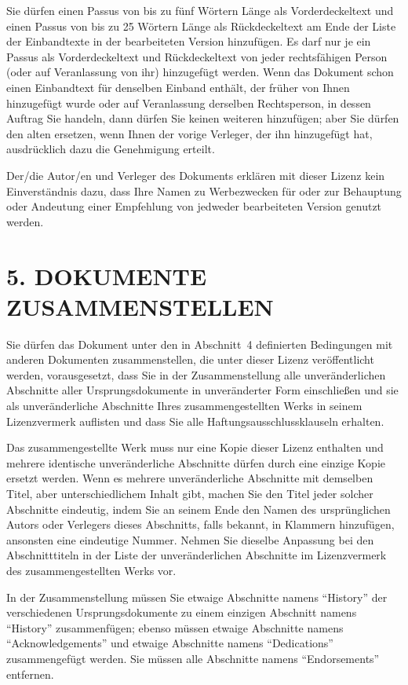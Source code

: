 Sie dürfen einen Passus von bis zu fünf Wörtern Länge als Vorderdeckeltext und einen
Passus von bis zu 25 Wörtern Länge als Rückdeckeltext am Ende der Liste der Einbandtexte
in der bearbeiteten Version hinzufügen. Es darf nur je ein Passus als Vorderdeckeltext
und Rückdeckeltext von jeder rechtsfähigen Person (oder auf Veranlassung von ihr) hinzugefügt werden.
Wenn das Dokument schon einen Einbandtext für denselben Einband enthält, der früher von Ihnen
hinzugefügt wurde oder auf Veranlassung derselben Rechtsperson, in dessen Auftrag Sie handeln,
dann dürfen Sie keinen weiteren hinzufügen; aber Sie dürfen den alten ersetzen, wenn Ihnen
der vorige Verleger, der ihn hinzugefügt hat, ausdrücklich dazu die Genehmigung erteilt.

Der/die Autor/en und Verleger des Dokuments erklären mit dieser Lizenz kein Einverständnis
dazu, dass Ihre Namen zu Werbezwecken für oder zur Behauptung oder Andeutung einer Empfehlung von 
jedweder bearbeiteten Version genutzt werden.

\section*{5. DOKUMENTE ZUSAMMENSTELLEN}

Sie dürfen das Dokument unter den in Abschnitt~4 definierten Bedingungen 
mit anderen Dokumenten zusammenstellen, die unter dieser Lizenz veröffentlicht
werden, vorausgesetzt, dass Sie in der Zusammenstellung alle unveränderlichen 
Abschnitte aller Ursprungsdokumente in unveränderter Form einschließen und
sie als unveränderliche Abschnitte Ihres zusammengestellten Werks in seinem
Lizenzvermerk auflisten und dass Sie alle Haftungsausschlussklauseln erhalten.

Das zusammengestellte Werk muss nur eine Kopie dieser Lizenz enthalten und
mehrere identische unveränderliche Abschnitte dürfen durch eine einzige Kopie
ersetzt werden. Wenn es mehrere unveränderliche Abschnitte mit demselben Titel, aber
unterschiedlichem Inhalt gibt, machen Sie den Titel jeder solcher Abschnitte eindeutig,
indem Sie an seinem Ende den Namen des ursprünglichen Autors oder Verlegers dieses Abschnitts, 
falls bekannt, in Klammern hinzufügen, ansonsten eine eindeutige Nummer.
Nehmen Sie dieselbe Anpassung bei den Abschnitttiteln in der Liste der unveränderlichen Abschnitte
im Lizenzvermerk des zusammengestellten Werks vor.

In der Zusammenstellung müssen Sie etwaige Abschnitte namens "`History"' der verschiedenen
Ursprungsdokumente zu einem einzigen Abschnitt namens "`History"' zusammenfügen;
ebenso müssen etwaige Abschnitte namens "`Acknowledgements"' und etwaige Abschnitte namens
"`Dedications"' zusammengefügt werden. Sie müssen alle Abschnitte namens 
"`Endorsements"' entfernen.

